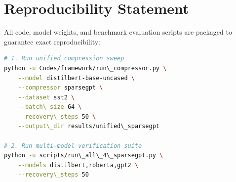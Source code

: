 \section{Reproducibility Statement}
All code, model weights, and benchmark evaluation scripts are packaged to guarantee exact reproducibility:
\begin{lstlisting}[language=bash]
# 1. Run unified compression sweep
python -u Codes/framework/run\_compressor.py \
    --model distilbert-base-uncased \
    --compressor sparsegpt \
    --dataset sst2 \
    --batch\_size 64 \
    --recovery\_steps 50 \
    --output\_dir results/unified\_sparsegpt

# 2. Run multi-model verification suite
python -u scripts/run\_all\_4\_sparsegpt.py \
    --models distilbert,roberta,gpt2 \
    --recovery\_steps 50
\end{lstlisting}
